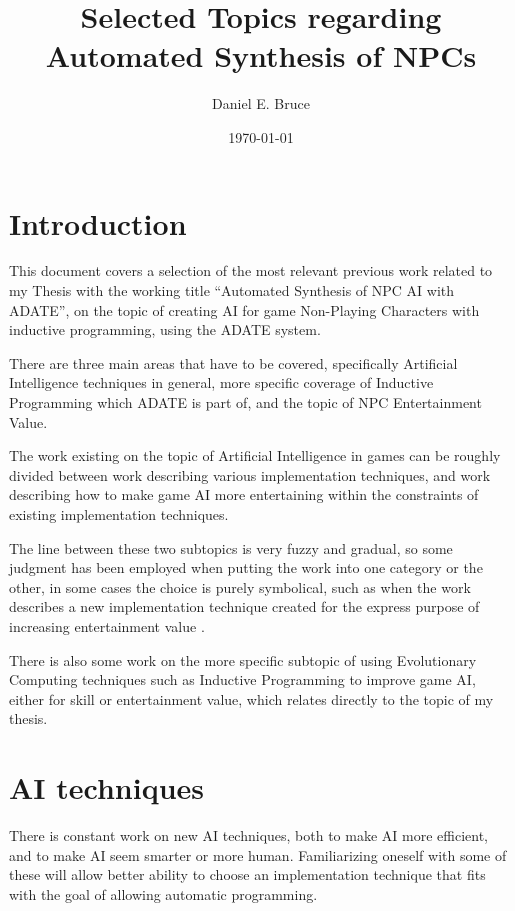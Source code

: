 \documentclass[]{report}
\begin{document}
\title{Selected Topics regarding Automated Synthesis of NPCs}
\author{Daniel E. Bruce}
\date{\today}
\maketitle

\tableofcontents


\chapter{Introduction}
\label{cha:introduction}

This document covers a selection of the most relevant previous work related to
my Thesis with the working title ``Automated Synthesis of NPC AI with ADATE'',
on the topic of creating AI for game Non-Playing Characters with inductive
programming, using the ADATE system.

There are three main areas that have to be covered, specifically Artificial
Intelligence techniques in general, more specific coverage of Inductive
Programming which ADATE is part of, and the topic of NPC Entertainment Value.

The work existing on the topic of Artificial Intelligence in games can be
roughly divided between work describing various implementation techniques, and
work describing how to make game AI more entertaining within the constraints of
existing implementation techniques.

The line between these two subtopics is very fuzzy and gradual, so some judgment
has been employed when putting the work into one category or the other, in some
cases the choice is purely symbolical, such as when the work describes a new
implementation technique created for the express purpose of increasing
entertainment value \citep[for example][]{khoo2002efficient}.

There is also some work on the more specific subtopic of using Evolutionary
Computing techniques such as Inductive Programming to improve game AI, either
for skill or entertainment value, which relates directly to the topic of my
thesis.

\chapter{AI techniques}
\label{cha:ai-techniques}

There is constant work on new AI techniques, both to make AI more efficient, and
to make AI seem smarter or more human. Familiarizing oneself with some of these
will allow better ability to choose an implementation technique that fits with
the goal of allowing automatic programming.
\end{document}
